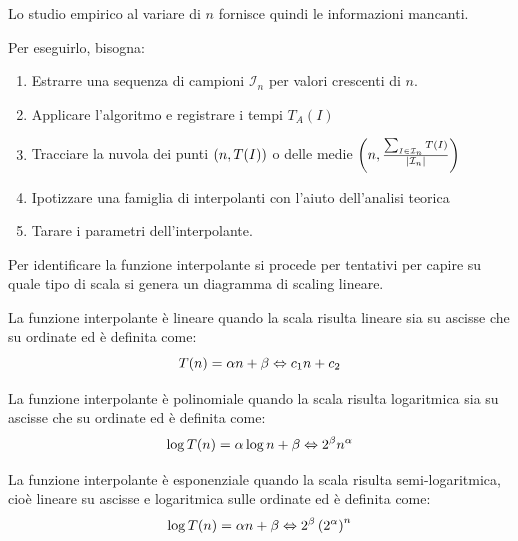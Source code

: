 \documentclass[\main/main.tex]{subfiles}
\begin{document}
\begin{multicols}{2}
\begin{definition}
    Lo studio empirico al variare di \(n\) fornisce quindi le informazioni mancanti.
    
    Per eseguirlo, bisogna:
    \begin{enumerate}
        \item Estrarre una sequenza di campioni \(\mathcal{I}_n\) per valori crescenti di \(n\).
        \item Applicare l'algoritmo e registrare i tempi \(T_A(I)\)
        \item Tracciare la nuvola dei punti \(\left(n, T(I)\right)\) o delle medie \(\left(n, \frac{\sum_{I\in \mathcal{I}_n} T(I)}{\left\lvert\mathcal{I}_n\right\rvert}\right)\)
        \item Ipotizzare una famiglia di interpolanti con l'aiuto dell'analisi teorica
        \item Tarare i parametri dell'interpolante.
    \end{enumerate}
\end{definition}
\begin{observation}
    Per identificare la funzione interpolante si procede per tentativi per capire su quale tipo di scala si genera un diagramma di scaling lineare.
\end{observation}
\begin{definition}
    La funzione interpolante è lineare quando la scala risulta lineare sia su ascisse che su ordinate ed è definita come:
    \[
        T(n) = \alpha n + \beta \Leftrightarrow c_1 n + c_2 
    \]
\end{definition}
\begin{definition}
    La funzione interpolante è polinomiale quando la scala risulta logaritmica sia su ascisse che su ordinate ed è definita come:
    \[
        \log T(n) = \alpha \log n + \beta \Leftrightarrow 2^\beta n^\alpha
    \]
\end{definition}
\begin{definition}
     La funzione interpolante è esponenziale quando la scala risulta semi-logaritmica, cioè lineare su ascisse e logaritmica sulle ordinate ed è definita come:
     \[
        \log T(n) = \alpha n + \beta \Leftrightarrow 2^\beta \left(2^\alpha\right)^n
    \]
\end{definition}
\end{multicols}
\end{document}

